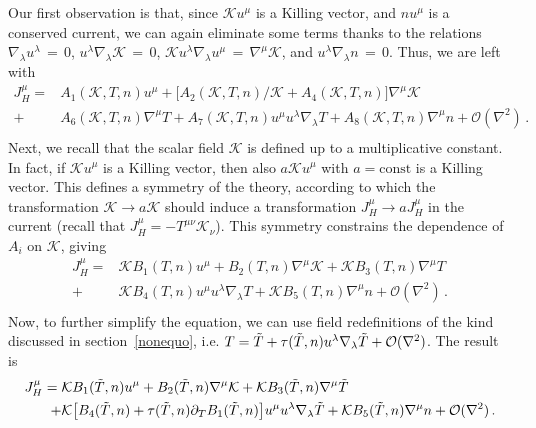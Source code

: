 \documentclass[a4paper, amsfonts, amssymb, amsmath, reprint, showkeys, nofootinbib, twoside, onecolumn,notitlepage]{revtex4-1}
\newcommand{\K}{{\mathcal{K}}}
\theoremstyle{definition}
\theoremstyle{theorem}
\begin{document}
Our first observation is that, since $\K u^\mu$ is a Killing vector, and $nu^\mu$ is a conserved current, we can again eliminate some terms thanks to the relations $\nabla_\lambda u^\lambda\,{=}\,0$, $u^\lambda \nabla_\lambda \K\,{=}\,0$, $\K u^\lambda \nabla_\lambda u^\mu \,{=}\,\nabla^\mu \K$, and $u^\lambda \nabla_\lambda n\,{=}\,0$. Thus, we are left with
\begin{equation}\label{BDNKov2}
\begin{split}
J^\mu_H ={}& A_1(\K,T,n) u^\mu+\big[A_2(\K,T,n)/\K + A_4 (\K,T,n)\big] \nabla^\mu \K    \\
+{}& A_6(\K,T,n)\nabla^\mu T+A_7(\K,T,n) u^\mu u^\lambda \nabla_\lambda T+ A_8(\K,T,n)\nabla^\mu n +\mathcal{O}(\nabla^2) \, .\\
\end{split}    
\end{equation}
Next, we recall that the scalar field $\K$ is defined up to a multiplicative constant. In fact, if $\K u^\mu$ is a Killing vector, then also $a\K u^\mu$ with $a=\text{const}$ is a Killing vector. This defines a symmetry of the theory, according to which the transformation $\K \rightarrow a\K$ should induce a transformation $J_H^\mu \rightarrow aJ_H^\mu$ in the current (recall that $J_H^\mu=-T^{\mu \nu}\K_\nu$). This symmetry constrains the dependence of $A_i$ on $\K$, giving
\begin{equation}\label{BDNKov3}
\begin{split}
J^\mu_H ={}& \K B_1(T,n) u^\mu+B_2(T,n) \nabla^\mu \K   +\K B_3(T,n)\nabla^\mu T \\
+{}& \K B_4 (T,n) u^\mu u^\lambda \nabla_\lambda T+\K B_5(T,n)\nabla^\mu n +\mathcal{O}(\nabla^2) \, .\\
\end{split}    
\end{equation}
Now, to further simplify the equation, we can use field redefinitions of the kind discussed in section~\ref{nonequo}, i.e.  $T=\Tilde{T}+\tau(\Tilde{T},n)u^\lambda \nabla_\lambda \Tilde{T}+\mathcal{O}(\nabla^2)$. The result is
\begin{equation}\label{BDNKov4}
\begin{split}
J^\mu_H ={}& \K B_1(\Tilde{T},n) u^\mu+B_2(\Tilde{T},n) \nabla^\mu \K   +\K B_3(\Tilde{T},n)\nabla^\mu \Tilde{T} \\
+{}& \K \big[ B_4 (\Tilde{T},n)+\tau (\Tilde{T},n)\partial_T B_1(\Tilde{T},n)\big] u^\mu u^\lambda \nabla_\lambda \Tilde{T}+\K B_5(\Tilde{T},n)\nabla^\mu n +\mathcal{O}(\nabla^2) \, .\\
\end{split}    
\end{equation}
\end{document}
